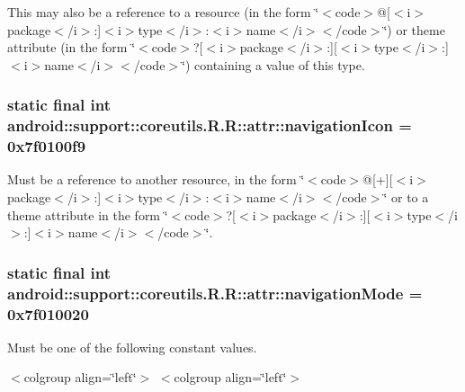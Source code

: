 This may also be a reference to a resource (in the form \char`\"{}$<$code$>$@\mbox{[}$<$i$>$package$<$/i$>$:\mbox{]}$<$i$>$type$<$/i$>$:$<$i$>$name$<$/i$>$$<$/code$>$\char`\"{}) or theme attribute (in the form \char`\"{}$<$code$>$?\mbox{[}$<$i$>$package$<$/i$>$:\mbox{]}\mbox{[}$<$i$>$type$<$/i$>$:\mbox{]}$<$i$>$name$<$/i$>$$<$/code$>$\char`\"{}) containing a value of this type. \hypertarget{classandroid_1_1support_1_1coreutils_1_1_r_1_1attr_bdc43dff8f6bc804d2b7386274906a95}{
\subsubsection[{navigationIcon}]{\setlength{\rightskip}{0pt plus 5cm}static final int android::support::coreutils.R.R::attr::navigationIcon = 0x7f0100f9}}
\label{classandroid_1_1support_1_1coreutils_1_1_r_1_1attr_bdc43dff8f6bc804d2b7386274906a95}


Must be a reference to another resource, in the form \char`\"{}$<$code$>$@\mbox{[}+\mbox{]}\mbox{[}$<$i$>$package$<$/i$>$:\mbox{]}$<$i$>$type$<$/i$>$:$<$i$>$name$<$/i$>$$<$/code$>$\char`\"{} or to a theme attribute in the form \char`\"{}$<$code$>$?\mbox{[}$<$i$>$package$<$/i$>$:\mbox{]}\mbox{[}$<$i$>$type$<$/i$>$:\mbox{]}$<$i$>$name$<$/i$>$$<$/code$>$\char`\"{}. \hypertarget{classandroid_1_1support_1_1coreutils_1_1_r_1_1attr_cc0dd19990ecb8157fba94355c4060fc}{
\subsubsection[{navigationMode}]{\setlength{\rightskip}{0pt plus 5cm}static final int android::support::coreutils.R.R::attr::navigationMode = 0x7f010020}}
\label{classandroid_1_1support_1_1coreutils_1_1_r_1_1attr_cc0dd19990ecb8157fba94355c4060fc}


Must be one of the following constant values. \begin{TabularC}{0}
\hline
\end{TabularC}
$<$colgroup align=\char`\"{}left\char`\"{}$>$ $<$colgroup align=\char`\"{}left\char`\"{}$>$ 

